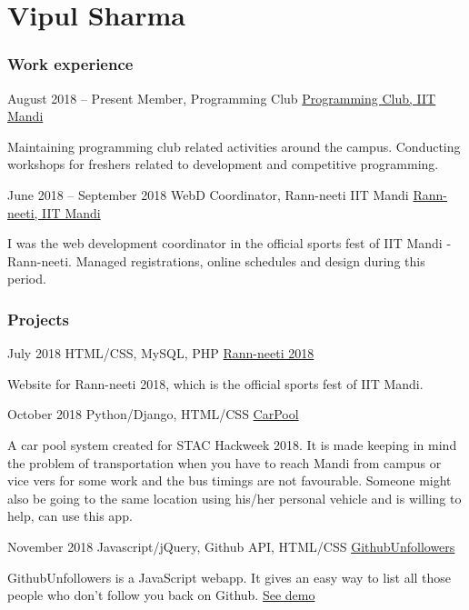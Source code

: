 \documentclass{tccv}
\begin{document}
\part{Vipul Sharma}

\section{Work experience}

\begin{eventlist}

\item{August 2018 -- Present}
     {Member, Programming Club}
     {\href{https://www.facebook.com/prog.iitmandi/}{Programming Club, IIT Mandi}}

Maintaining programming club related activities around the campus. Conducting workshops for freshers related to development and competitive programming.

\item{June 2018 -- September 2018}
     {WebD Coordinator, Rann-neeti IIT Mandi}
     {\href{http://www.rann-neeti.co/}{Rann-neeti, IIT Mandi}}

I was the web development coordinator in the official sports fest of IIT Mandi - Rann-neeti. Managed registrations, online schedules and design during this period.

\end{eventlist}

\section{Projects}

\begin{eventlist}

\item{July 2018}
	{HTML/CSS, MySQL, PHP}
    {\href{https://github.com/vsvipul/Rann-Neeti-2018}{Rann-neeti 2018}}

Website for Rann-neeti 2018, which is the official sports fest of IIT Mandi.

\item{October 2018}
     {Python/Django, HTML/CSS}
     {\href{https://github.com/vsvipul/Car-Pool}{CarPool}}

A car pool system created for STAC Hackweek 2018. It is made keeping in mind the problem of transportation when you have to reach Mandi from campus or vice vers for some work and the bus timings are not favourable. Someone might also be going to the same location using his/her personal vehicle and is willing to help, can use this app.

\item{November 2018}
     {Javascript/jQuery, Github API, HTML/CSS}
     {\href{https://github.com/vsvipul/GithubUnfollowers}{GithubUnfollowers}}


GithubUnfollowers is a JavaScript webapp. It gives an easy way to list all those people who don't follow you back on Github. {\href{https://vsvipul.github.io/GithubUnfollowers/}{See demo}}

\end{eventlist}
\end{document}
